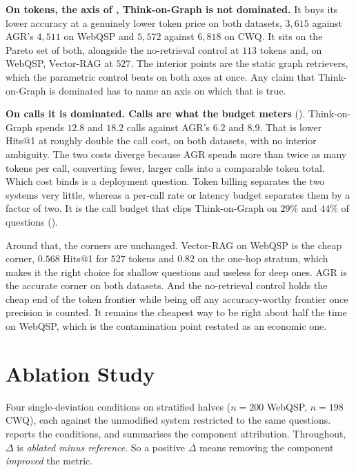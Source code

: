 \textbf{On tokens, the axis of , Think-on-Graph is not
dominated.} It buys its lower accuracy at a genuinely lower token price on both
datasets, $3{,}615$ against AGR's $4{,}511$ on WebQSP and $5{,}572$ against
$6{,}818$ on CWQ. It sits on the Pareto set of both, alongside the no-retrieval
control at $113$ tokens and, on WebQSP, Vector-RAG at $527$. The interior points
are the static graph retrievers, which the parametric control beats on both axes
at once. Any claim that Think-on-Graph is dominated has to name an axis on which
that is true.

\textbf{On calls it is dominated. Calls are what the budget meters}
(). Think-on-Graph spends $12.8$ and $18.2$ calls against
AGR's $6.2$ and $8.9$. That is lower Hits@1 at roughly double the call cost, on
both datasets, with no interior ambiguity. The two costs diverge because AGR
spends more than twice as many tokens per call, converting fewer, larger calls
into a comparable token total. Which cost binds is a deployment question. Token
billing separates the two systems very little, whereas a per-call rate or
latency budget separates them by a factor of two. It is the call budget that
clips Think-on-Graph on $29\%$ and $44\%$ of questions ().

Around that, the corners are unchanged. Vector-RAG on WebQSP is the cheap
corner, $0.568$ Hits@1 for $527$ tokens and $0.82$ on the one-hop stratum, which
makes it the right choice for shallow questions and useless for deep ones. AGR
is the accurate corner on both datasets. And the no-retrieval control holds the
cheap end of the token frontier while being off any accuracy-worthy frontier
once precision is counted. It remains the cheapest way to be right about half
the time on WebQSP, which is the contamination point restated as an economic
one.

\section{Ablation Study}\label{sec:ablations}

Four single-deviation conditions on stratified halves ($n = 200$ WebQSP, $n =
198$ CWQ), each against the unmodified system restricted to the same questions.
 reports the conditions, and  summarises the
component attribution. Throughout, $\Delta$ is \emph{ablated minus reference}.
So a positive $\Delta$ means removing the component \emph{improved} the metric.

